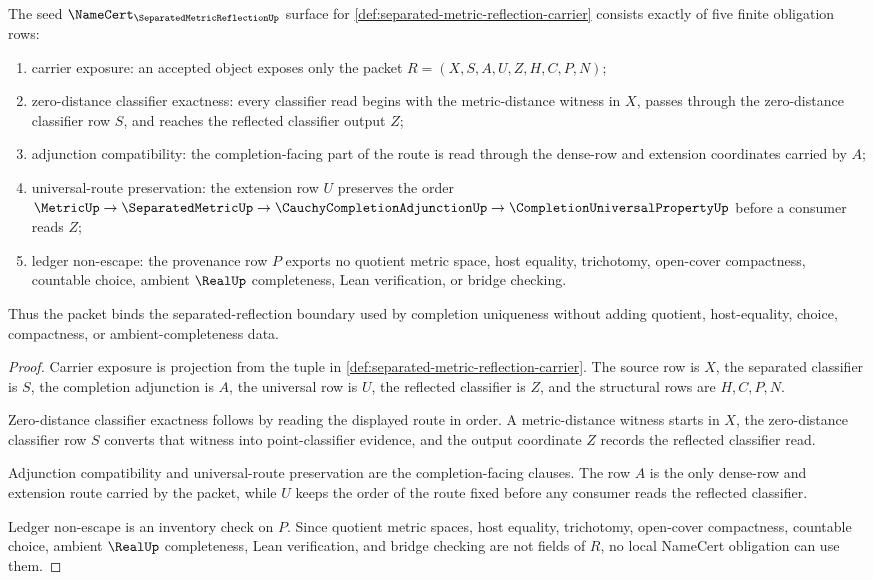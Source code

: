 \begin{theorem}
\label{thm:separated-metric-reflection-namecert-obligations}
The seed $\NameCert_{\SeparatedMetricReflectionUp}$ surface for \autoref{def:separated-metric-reflection-carrier} consists exactly of five finite obligation rows:
\begin{enumerate}
\item carrier exposure: an accepted object exposes only the packet $R=(X,S,A,U,Z,H,C,P,N)$;
\item zero-distance classifier exactness: every classifier read begins with the metric-distance witness in $X$, passes through the zero-distance classifier row $S$, and reaches the reflected classifier output $Z$;
\item adjunction compatibility: the completion-facing part of the route is read through the dense-row and extension coordinates carried by $A$;
\item universal-route preservation: the extension row $U$ preserves the order $\MetricUp\to\SeparatedMetricUp\to\CauchyCompletionAdjunctionUp\to\CompletionUniversalPropertyUp$ before a consumer reads $Z$;
\item ledger non-escape: the provenance row $P$ exports no quotient metric space, host equality, trichotomy, open-cover compactness, countable choice, ambient $\RealUp$ completeness, Lean verification, or bridge checking.
\end{enumerate}
Thus the packet binds the separated-reflection boundary used by completion uniqueness without adding quotient, host-equality, choice, compactness, or ambient-completeness data.
\end{theorem}
\begin{proof}
Carrier exposure is projection from the tuple in \autoref{def:separated-metric-reflection-carrier}. The source row is $X$, the separated classifier is $S$, the completion adjunction is $A$, the universal row is $U$, the reflected classifier is $Z$, and the structural rows are $H,C,P,N$.

Zero-distance classifier exactness follows by reading the displayed route in order. A metric-distance witness starts in $X$, the zero-distance classifier row $S$ converts that witness into point-classifier evidence, and the output coordinate $Z$ records the reflected classifier read.

Adjunction compatibility and universal-route preservation are the completion-facing clauses. The row $A$ is the only dense-row and extension route carried by the packet, while $U$ keeps the order of the route fixed before any consumer reads the reflected classifier.

Ledger non-escape is an inventory check on $P$. Since quotient metric spaces, host equality, trichotomy, open-cover compactness, countable choice, ambient $\RealUp$ completeness, Lean verification, and bridge checking are not fields of $R$, no local NameCert obligation can use them.
\end{proof}

